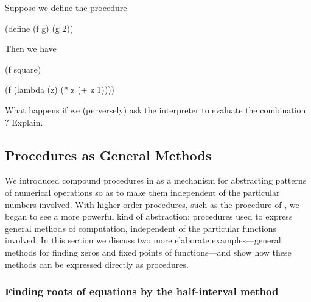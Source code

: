 \begin{exercise}
\label{Exercise 1.34}
	Suppose we define the procedure
	\begin{scheme}
	  (define (f g) (g 2))
	\end{scheme}
	Then we have
	\begin{scheme}
	  (f square)
	  ~~

	  (f (lambda (z) (* z (+ z 1))))
	  ~~
	\end{scheme}
	What happens if we (perversely) ask the interpreter to evaluate the combination ?
	Explain.
\end{exercise}



\subsection{Procedures as General Methods}
\label{Section 1.3.3}

We introduced compound procedures in  as a mechanism for abstracting patterns of numerical operations so as to make them independent of the particular numbers involved.
With higher-order procedures, such as the  procedure of , we began to see a more powerful kind of abstraction:
procedures used to express general methods of computation, independent of the particular functions involved.
In this section we discuss two more elaborate examples---general methods for finding zeros and fixed points of functions---and show how these methods can be expressed directly as procedures.



\subsubsection*{Finding roots of equations by the half-interval method}

